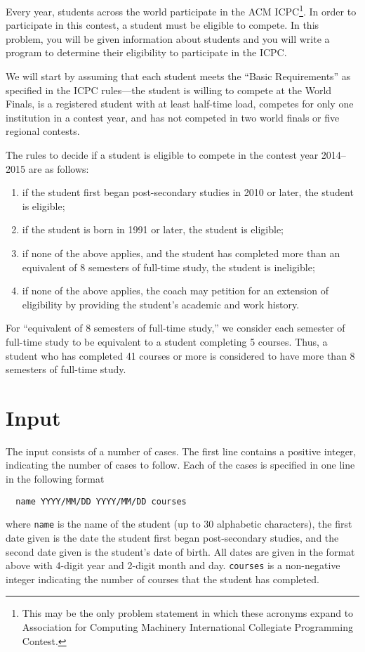 
\setlength{\columnsep}{15pt}
%

Every year, students across the world participate in the ACM
ICPC\footnote{This may be the only problem statement in which these
  acronyms expand to Association for Computing Machinery International
  Collegiate Programming Contest.}.  In order to participate in this
contest, a student must be eligible to compete.  In this problem, you
will be given information about students and you will write a program to
determine their eligibility to participate in the ICPC.

We will start by assuming that each student meets the ``Basic Requirements'' as
specified in the ICPC rules---the student is willing to compete at the
World Finals, is a registered student with at least half-time load,
competes for only one institution in a contest year, and has not
competed in two world finals or five regional contests.

The rules to decide if a student is eligible to compete in the contest
year 2014--2015 are as follows:
\begin{enumerate}
\item if the student first began post-secondary studies in 2010 or later,
  the student is eligible;
\item if the student is born in 1991 or later, the student is eligible;
\item if none of the above applies, and the student has completed more than
 an equivalent of 8 semesters of full-time study, the student is ineligible;
\item if none of the above applies, the coach may petition for an extension
  of eligibility by providing the student's academic and work history.
\end{enumerate}
For ``equivalent of 8 semesters of full-time study,'' we consider each
semester of full-time study to be equivalent to a student completing 5
courses.  Thus, a student who has completed 41 courses or more is
considered to have more than 8 semesters of full-time study.

\section*{Input}

The input consists of a number of cases.  The first line contains a
positive integer, indicating the number of cases to follow.  Each of
the cases is specified in one line in the following format
\begin{verbatim}
  name YYYY/MM/DD YYYY/MM/DD courses
\end{verbatim}
where \verb|name| is the name of the student (up to 30 alphabetic
characters), the first date given is the date the student first began
post-secondary studies, and the second date given is the student's
date of birth.  All dates are given in the format above with 4-digit
year and 2-digit month and day.  \verb|courses| is a non-negative
integer indicating the number of courses that the student has completed.


